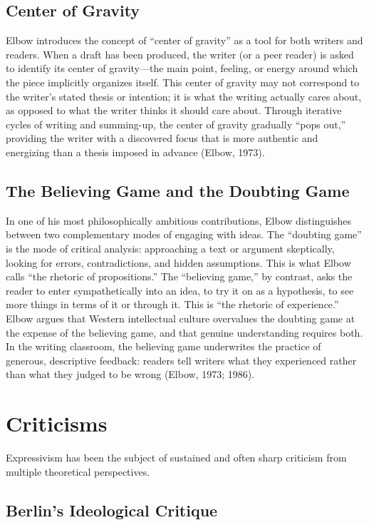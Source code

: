 \documentclass[12pt]{article}
\begin{document}
\subsection{Center of Gravity}

Elbow introduces the concept of ``center of gravity'' as a tool for both writers and readers. When a draft has been produced, the writer (or a peer reader) is asked to identify its center of gravity---the main point, feeling, or energy around which the piece implicitly organizes itself. This center of gravity may not correspond to the writer's stated thesis or intention; it is what the writing actually cares about, as opposed to what the writer thinks it should care about. Through iterative cycles of writing and summing-up, the center of gravity gradually ``pops out,'' providing the writer with a discovered focus that is more authentic and energizing than a thesis imposed in advance (Elbow, 1973).

\subsection{The Believing Game and the Doubting Game}

In one of his most philosophically ambitious contributions, Elbow distinguishes between two complementary modes of engaging with ideas. The ``doubting game'' is the mode of critical analysis: approaching a text or argument skeptically, looking for errors, contradictions, and hidden assumptions. This is what Elbow calls ``the rhetoric of propositions.'' The ``believing game,'' by contrast, asks the reader to enter sympathetically into an idea, to try it on as a hypothesis, to see more things in terms of it or through it. This is ``the rhetoric of experience.'' Elbow argues that Western intellectual culture overvalues the doubting game at the expense of the believing game, and that genuine understanding requires both. In the writing classroom, the believing game underwrites the practice of generous, descriptive feedback: readers tell writers what they experienced rather than what they judged to be wrong (Elbow, 1973; 1986).

\section{Criticisms}

Expressivism has been the subject of sustained and often sharp criticism from multiple theoretical perspectives.

\subsection{Berlin's Ideological Critique}
\end{document}
